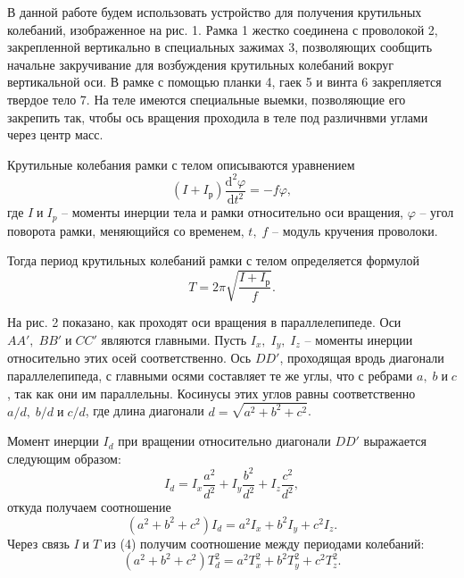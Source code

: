 \documentclass[a4paper, 12pt]{article}
\begin{document}
        \vspace{-7mm}
        В данной работе будем использовать устройство для получения крутильных колебаний, изображенное на рис. 1. Рамка 1 жестко соединена с проволокой 2, закрепленной вертикально в специальных зажимах 3, позволяющих сообщить начальне закручивание для возбуждения крутильных колебаний вокруг вертикальной оси. В рамке с помощью планки 4, гаек 5 и винта 6 закрепляется твердое тело 7. На теле имеются специальные выемки, позволяющие его закрепить так, чтобы ось вращения проходила в теле под различнвми углами через центр масс.
        
        Крутильные колебания рамки с телом описываются уравнением
        \vspace{-3mm}
        \begin{equation}
            (I + I_{р})\frac{\mathrm{d}^2\varphi}{\mathrm{d}t^2} = -f\varphi,
        \end{equation}
        где $I\;и\;I_p$ -- моменты инерции тела и рамки относительно оси вращения, $\varphi$ -- угол поворота рамки, меняющийся со временем, $t,\;f$ -- модуль кручения проволоки.

        Тогда период крутильных колебаний рамки с телом определяется формулой
        \begin{equation}
            T = 2\pi\sqrt{\frac{I + I_{р}}{f}}.
        \end{equation}

        На рис. 2 показано, как проходят оси вращения в параллелепипеде. Оси $AA',\;BB'\;и\;CC'$ являются главными. Пусть $I_x,\;I_y,\;I_z$ -- моменты инерции относительно этих осей соответственно. Ось $DD'$, проходящая вродь диагонали параллелепипеда, с главными осями составляет те же углы, что с ребрами $a,\;b\;и\;c$, так как они им параллельны. Косинусы этих углов равны соответственно $a/d,\;b/d\;и\;c/d$, где длина диагонали $d = \sqrt{a^2 + b^2 + c^2}$.

        Момент инерции $I_d$ при вращении относительно диагонали $DD'$ выражается следующим образом:
        \begin{equation}
            I_d = I_x\frac{a^2}{d^2} + I_y\frac{b^2}{d^2} + I_z\frac{c^2}{d^2},
        \end{equation}
        откуда получаем соотношение
        \begin{equation}
            (a^2 + b^2 + c^2)I_d = a^2I_x + b^2I_y + c^2I_z.
        \end{equation}
        Через связь $I\;и\;T$ из (4) получим соотношение между периодами колебаний:
        \begin{equation}
            (a^2 + b^2 + c^2)T_d^2 = a^2T_x^2 + b^2T_y^2 + c^2T_z^2.
        \end{equation}
        
\end{document}
